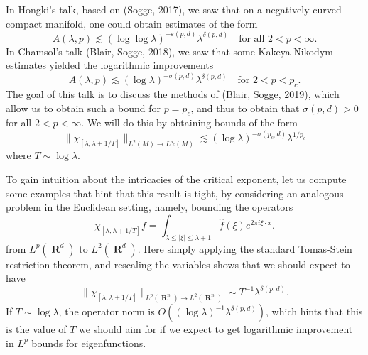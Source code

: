 \documentclass{article}
\DeclareMathOperator{\RR}{\mathbf{R}}
\theoremstyle{plain}
\theoremstyle{remark}
\theoremstyle{definition}
\begin{document}
In Hongki's talk, based on (Sogge, 2017), we saw that on a negatively curved compact manifold, one could obtain estimates of the form
%
\[ A(\lambda,p) \lesssim (\log \log \lambda)^{-\varepsilon(p,d)} \lambda^{\delta(p,d)} \quad\text{for all $2 < p < \infty$}. \]
%
In Chamsol's talk (Blair, Sogge, 2018), we saw that some Kakeya-Nikodym estimates yielded the logarithmic improvements
%
\[ A(\lambda,p) \lesssim  (\log \lambda)^{-\sigma(p,d)} \lambda^{\delta(p,d)} \quad\text{for $2 < p < p_c$}. \]
%
The goal of this talk is to discuss the methods of (Blair, Sogge, 2019), which allow us to obtain such a bound for $p = p_c$, and thus to obtain that $\sigma(p,d) > 0$ for all $2 < p < \infty$. We will do this by obtaining bounds of the form
%
\[ \| \chi_{[\lambda,\lambda + 1/T]} \|_{L^2(M) \to L^{p_c}(M)} \lesssim (\log \lambda)^{- \sigma(p_c,d)} \lambda^{1/p_c} \]
%
where $T \sim \log \lambda$.

To gain intuition about the intricacies of the critical exponent, let us compute some examples that hint that this result is tight, by considering an analogous problem in the Euclidean setting, namely, bounding the operators
%
\[ \chi_{[\lambda,\lambda+1/T]} f = \int_{\lambda \leq |\xi| \leq \lambda + 1} \widehat{f}(\xi) e^{2 \pi i \xi \cdot x}. \]
%
from $L^p(\RR^d)$ to $L^2(\RR^d)$. Here simply applying the standard Tomas-Stein restriction theorem, and rescaling the variables shows that we should expect to have
%
\[ \| \chi_{[\lambda,\lambda+1/T]} \|_{L^p(\RR^n) \to L^2(\RR^n)} \sim T^{-1} \lambda^{\delta(p,d)}. \]
%
If $T \sim \log \lambda$, the operator norm is $O((\log \lambda)^{-1} \lambda^{ \delta(p,d)})$, which hints that this is the value of $T$ we should aim for if we expect to get logarithmic improvement in $L^p$ bounds for eigenfunctions.
\end{document}
